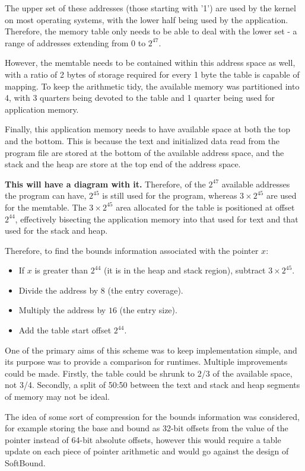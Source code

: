 The upper set of these addresses (those starting with '1') are used by the kernel on most operating systems, with the lower half being used by the application.
Therefore, the memory table only needs to be able to deal with the lower set - a range of addresses extending from $0$ to $2^{47}$.

However, the memtable needs to be contained within this address space as well, with a ratio of 2 bytes of storage required for every 1 byte the table is capable of mapping.
To keep the arithmetic tidy, the available memory was partitioned into 4, with 3 quarters being devoted to the table and 1 quarter being used for application memory.

Finally, this application memory needs to have available space at both the top and the bottom.
This is because the text and initialized data read from the program file are stored at the bottom of the available address space, and the stack and the heap are store at the top end of the address space.

\textbf{This will have a diagram with it.} Therefore, of the $2^{47}$ available addresses the program can have, $2^{45}$ is still used for the program, whereas $3\times 2^{45}$ are used for the memtable.
The $3\times 2^{45}$ area allocated for the table is positioned at offset $2^{44}$, effectively bisecting the application memory into that used for text and that used for the stack and heap.

Therefore, to find the bounds information associated with the pointer $x$:

\begin{itemize}
\item If $x$ is greater than $2^{44}$ (it is in the heap and stack region), subtract $3\times 2^{45}$.
\item Divide the address by $8$ (the entry coverage).
\item Multiply the address by $16$ (the entry size).
\item Add the table start offset $2^{44}$.
\end{itemize}

One of the primary aims of this scheme was to keep implementation simple, and its purpose was to provide a comparison for runtimes.
Multiple improvements could be made.
Firstly, the table could be shrunk to 2/3 of the available space, not 3/4.
Secondly, a split of 50:50 between the text and stack and heap segments of memory may not be ideal.

The idea of some sort of compression for the bounds information was considered, for example storing the base and bound as 32-bit offsets from the value of the pointer instead of 64-bit absolute offsets, however this would require a table update on each piece of pointer arithmetic and would go against the design of SoftBound.
